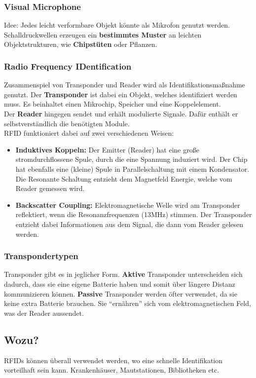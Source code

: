 \documentclass[a4paper]{article}
\begin{document}
\subsubsection{Visual Microphone}
Idee: Jedes leicht verformbare Objekt könnte als Mikrofon genutzt werden. Schalldruckwellen erzeugen ein \textbf{bestimmtes Muster} an leichten Objektstrukturen, wie \textbf{Chipstüten} oder Pflanzen.
\subsubsection{Radio Frequency IDentification}
Zusammenspiel von Transponder und Reader wird als Identifikationsmaßnahme genutzt.
Der \textbf{Transponder} ist dabei ein Objekt, welches identifiziert werden muss. Es beinhaltet einen Mikrochip, Speicher und eine Koppelelement.\\
Der \textbf{Reader} hingegen sendet und erhält modulierte Signale. Dafür enthält er selbstverständlich die benötigten Module.\\

RFID funktioniert dabei auf zwei verschiedenen Weisen:
\begin{itemize}
	\item \textbf{Induktives Koppeln:} Der Emitter (Reader) hat eine große stromdurchflossene Spule, durch die eine Spannung induziert wird. Der Chip hat ebenfalls eine (kleine) Spule in Parallelschaltung mit einem Kondensator. Die Resonante Schaltung entzieht dem Magnetfeld Energie, welche vom Reader gemessen wird.
	\item \textbf{Backscatter Coupling:} Elektromagnetische Welle wird am Transponder reflektiert, wenn die Resonanzfrequenzen (13MHz) stimmen. Der Transponder entzieht dabei Informationen aus dem Signal, die dann vom Reader gelesen werden.
\end{itemize}

\subsubsection{Transpondertypen}
Transponder gibt es in jeglicher Form. \textbf{Aktive} Transponder unterscheiden sich dadurch, dass sie eine eigene Batterie haben und somit über längere Distanz kommunizieren können. \textbf{Passive} Transponder werden öfter verwendet, da sie keine extra Batterie brauchen. Sie ``ernähren'' sich vom elektromagnetischen Feld, was der Reader aussendet.

\subsection{Wozu?}
RFIDs können überall verwendet werden, wo eine schnelle Identifikation vorteilhaft sein kann. Krankenhäuser, Mautstationen, Bibliotheken etc.\\
\end{document}
